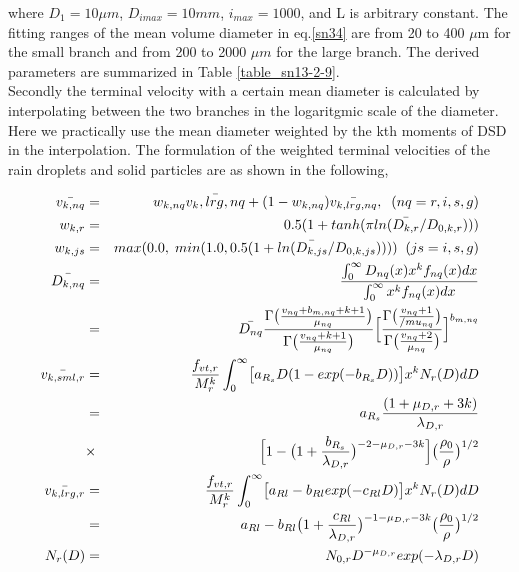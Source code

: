 where $D_{1}=10\mu m$, $D_{imax}=10mm$, $i_{max}=1000$, and L is arbitrary constant. The fitting ranges of the mean volume diameter in eq.\ref{sn34} are from 20 to 400 $\mu$m for the small branch and from 200 to 2000 $\mu m$ for the large branch. The derived parameters are summarized in Table \ref{table_sn13-2-9}.\\ 
Secondly the terminal velocity with a certain mean diameter is calculated by interpolating between the two branches in the logaritgmic scale of the diameter. Here we practically use the mean diameter weighted by the kth moments of DSD in the interpolation. The formulation of the weighted terminal velocities of the rain droplets and solid particles are as shown in the following,

\begin{eqnarray}
\bar{v_{k,nq}}&=&w_{k,nq}\bar{v_k,lrg,nq}+(1-w_{k,nq})\bar{v_{k,lrg,nq}},\;\;(nq=r,i,s,g)\label{sn36}\\
w_{k,r}&=&0.5(1+tanh(\pi ln(\bar{D_{k,r}}/D_{0,k,r})))\nonumber\\
w_{k,js}&=&max(0.0, \;min(1.0,0.5(1+ln(\bar{D_{k,js}}/D_{0,k,js}))))\;\;(js=i,s,g)\nonumber\\
\bar{D_{k,nq}}&=&\frac{\int_{0}^{\infty}D_{nq}(x)x^{k}f_{nq}(x)dx}{\int_{0}^{\infty}x^{k}f_{nq}(x)dx}\nonumber\\
              &=&\bar{D_{nq}}\frac{\Gamma\bigl(\frac{v_{nq}+b_{m,nq}+k+1}{\mu_{nq}}\bigr)}{\Gamma\bigl(\frac{v_{nq}+k+1}{\mu_{nq}}\bigr)}\Bigl[\frac{\Gamma\bigl(\frac{v_{nq}+1}{/mu_{nq}}\bigr)}{\Gamma\bigl(\frac{v_{nq}+2}{\mu_{nq}}\bigr)}\Bigr]^{b_{m,nq}}\label{sn37}\\
\bar{v_{k,sml,r}}&=&\frac{f_{vt,r}}{M_{r}^{k}}\int_{0}^{\infty}\bigl[a_{R_{s}}D(1-exp(-b_{R_{s}}D))\bigr]x^{k}N_{r}(D)dD\nonumber\\
&=&a_{R_{s}}\frac{(1+\mu_{D,r}+3k)}{\lambda_{D,r}}\nonumber\\
&\times&\Bigl[1-\bigl(1+\frac{b_{R_{s}}}{\lambda_{D,r}}\bigr)^{-2-\mu_{D,r}-3k}\Bigr]\bigl(\frac{\rho_{0}}{\rho}\bigr)^{1/2}\label{sn38}\\
\bar{v_{k,lrg,r}}&=&\frac{f_{vt,r}}{M_{r}^{k}}\int_{0}^{\infty}\bigl[a_{Rl}-b_{Rl}exp(-c_{Rl}D)\bigr]x^{k}N_{r}(D)dD\nonumber\\
&=&a_{Rl}-b_{Rl}\bigl(1+\frac{c_{Rl}}{\lambda_{D,r}}\bigr)^{-1-\mu_{D,r}-3k}\bigl(\frac{\rho_{0}}{\rho}\bigr)^{1/2}\label{sn39}\\
N_{r}(D)&=&N_{0,r}D^{-\mu_{D,r}}exp(-\lambda_{D,r}D)
\end{eqnarray}

